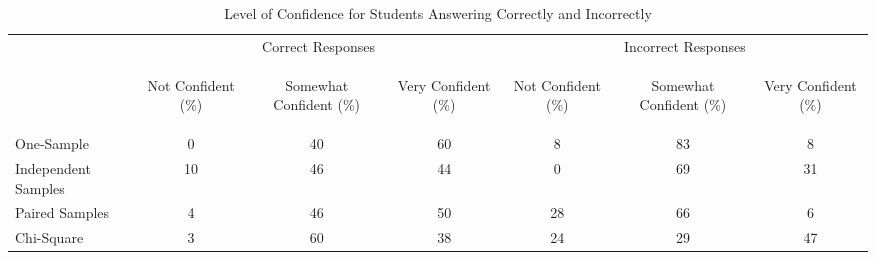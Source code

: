 \documentclass[12pt]{article}
\begin{document}
\begin{table}\caption{Level of Confidence for Students Answering Correctly and Incorrectly}\label{tb:confidence}\vspace*{1pc}
\begin{tabular}{p{1.5in}|ccc|ccc} 
\multicolumn{1}{c}{} & \multicolumn{3}{c}{Correct Responses} & \multicolumn{3}{c}{Incorrect Responses} \\[0.5pc]
 & \multicolumn{1}{p{0.71in}}{\vspace*{-2pc}\begin{center}Not Confident (\%)\end{center}\vspace*{-2pc}}
 & \multicolumn{1}{p{0.71in}}{\vspace*{-2.5pc}\begin{center}Somewhat Confident (\%)\end{center}\vspace*{-2pc}}
 & \multicolumn{1}{p{0.71in}}{\vspace*{-2pc}\begin{center}Very Confident (\%)\end{center}\vspace*{-2pc}}
 & \multicolumn{1}{|p{0.71in}}{\vspace*{-2pc}\begin{center}Not Confident (\%)\end{center}\vspace*{-2pc}}
 & \multicolumn{1}{p{0.71in}}{\vspace*{-2.5pc}\begin{center}Somewhat Confident (\%)\end{center}\vspace*{-2pc}}  
 & \multicolumn{1}{p{0.71in}}{\vspace*{-2pc}\begin{center}Very Confident (\%)\end{center}\vspace*{-2pc}}  \\ \hline
One-Sample & 0 & 40 & 60 & 8 & 83 & 8 \\
Independent Samples & 10 & 46 & 44 & 0 & 69 & 31 \\
Paired Samples & 4 & 46 & 50 & 28 & 66 & 6 \\
Chi-Square & 3 & 60 & 38 & 24 & 29 & 47 \\ \hline
\end{tabular}
\end{table}
\end{document}
